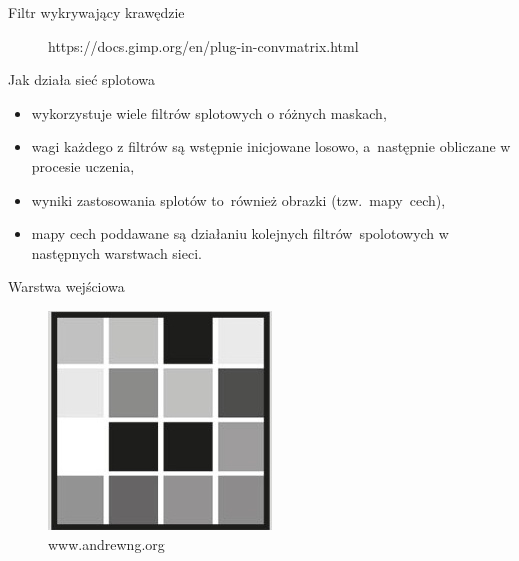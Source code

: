 \documentclass[xcolor=dvipsnames]{beamer}
\begin{document}
\begin{frame}{Filtr wykrywający krawędzie}
\begin{minipage}[t]{0.6\linewidth}
\begin{figure}
			\caption{https://docs.gimp.org/en/plug-in-convmatrix.html}
		\end{figure}
	\end{minipage}
\end{frame}

\begin{frame}{Jak działa sieć splotowa}
	\begin{itemize}
		\item wykorzystuje wiele filtrów splotowych o różnych maskach,
		\item wagi każdego z filtrów są wstępnie inicjowane losowo, a~następnie obliczane w procesie uczenia,
		\item wyniki zastosowania splotów to~również obrazki (tzw.~mapy~cech),
		\item mapy cech poddawane są działaniu kolejnych filtrów~spolotowych w następnych warstwach sieci.
	\end{itemize}
\end{frame}
\begin{frame}{Warstwa wejściowa}
	\begin{figure}
		\includegraphics[width=\linewidth, height=0.7\textheight, keepaspectratio] {img/hierarchical-learning1.jpg}
		\caption{www.andrewng.org}
	\end{figure}
\end{frame}
\end{document}
